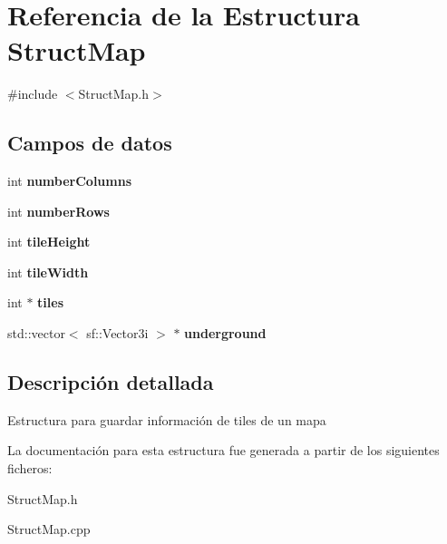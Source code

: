 \hypertarget{structStructMap}{}\section{Referencia de la Estructura Struct\+Map}
\label{structStructMap}


{\ttfamily \#include $<$Struct\+Map.\+h$>$}

\subsection*{Campos de datos}
\begin{DoxyCompactItemize}
\item 
\hypertarget{structStructMap_a64118a2afb5e259600f5c8412c97931a}{}int {\bfseries number\+Columns}\label{structStructMap_a64118a2afb5e259600f5c8412c97931a}

\item 
\hypertarget{structStructMap_a85d452fd6408616208edf76c4e8f2903}{}int {\bfseries number\+Rows}\label{structStructMap_a85d452fd6408616208edf76c4e8f2903}

\item 
\hypertarget{structStructMap_a3839f140fb8b2795554f855c18a20fdb}{}int {\bfseries tile\+Height}\label{structStructMap_a3839f140fb8b2795554f855c18a20fdb}

\item 
\hypertarget{structStructMap_a32790590928447bdcf6a5d8ca63d22be}{}int {\bfseries tile\+Width}\label{structStructMap_a32790590928447bdcf6a5d8ca63d22be}

\item 
\hypertarget{structStructMap_af71fbbc4cb1dff2825ba92e6e333e7e9}{}int $\ast$ {\bfseries tiles}\label{structStructMap_af71fbbc4cb1dff2825ba92e6e333e7e9}

\item 
\hypertarget{structStructMap_a4cb80a51771af2fd3ab061da75a7db00}{}std\+::vector$<$ sf\+::\+Vector3i $>$ $\ast$ {\bfseries underground}\label{structStructMap_a4cb80a51771af2fd3ab061da75a7db00}

\end{DoxyCompactItemize}


\subsection{Descripción detallada}
Estructura para guardar información de tiles de un mapa 

La documentación para esta estructura fue generada a partir de los siguientes ficheros\+:\begin{DoxyCompactItemize}
\item 
Struct\+Map.\+h\item 
Struct\+Map.\+cpp\end{DoxyCompactItemize}
